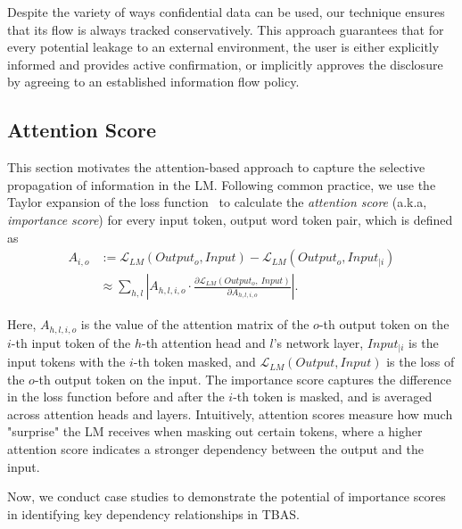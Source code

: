 Despite the variety of ways confidential data can be used, our technique ensures that its flow is always tracked conservatively. This approach guarantees that for every potential leakage to an external environment, the user is either explicitly informed and provides active confirmation, or implicitly approves the disclosure by agreeing to an established information flow policy.










\subsection{Attention Score}\label{sec:motivation-attn}

This section motivates the attention-based approach to capture the selective propagation of information in the LM. Following common practice, we use the Taylor expansion of the loss function~\cite{NEURIPS2019_2c601ad9} to calculate the \textit{attention score} (a.k.a, \textit{importance score}) for every input token, output word token pair, which is defined as
\begin{align}
    A_{i, o} &:= \mathcal{L}_{LM}(Output_{o}, Input) - \mathcal{L}_{LM}(Output_{o}, Input_{|i}) \\
    &\approx \sum_{h, l} \left| A_{h, l, i, o} \cdot \frac{\partial \mathcal{L}_{LM}(Output_o,\ Input)}{\partial A_{h, l, i, o}} \right|.
\end{align}

Here, $A_{h,l,i,o}$  is the value of the attention matrix of the $o$-th output token on the $i$-th input token of the $h$-th attention head and $l$'s network layer, $Input_{|i}$ is the input tokens with the $i$-th token masked, and $\mathcal{L}_{LM}(Output, Input)$ is the loss of the $o$-th output token on the input. The importance score captures the difference in the loss function before and after the $i$-th token is masked, and is averaged across attention heads and layers. Intuitively, attention scores measure how much "surprise" the LM receives when masking out certain tokens, where a higher attention score indicates a stronger dependency between the output and the input.

Now, we conduct case studies to demonstrate the potential of importance scores in identifying  key dependency relationships in TBAS.


